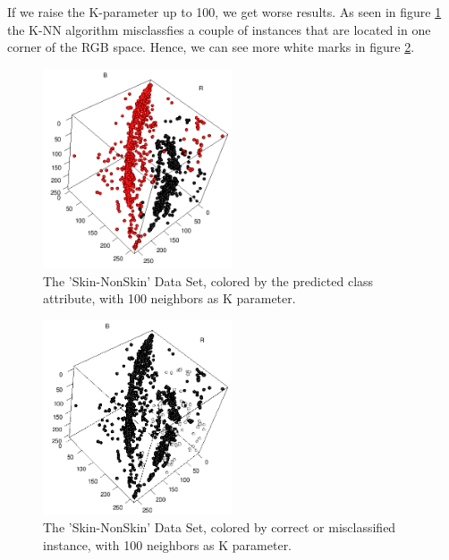 \documentclass[paper=a4, fontsize=11pt]{scrartcl} %
\numberwithin{equation}{section} %
\numberwithin{figure}{section} %
\numberwithin{table}{section} %
\begin{document}
If we raise the K-parameter up to 100, we get worse results. As seen in figure \ref{fig:skin:predicted:k100} the K-NN algorithm misclassfies a couple of instances that are located in one corner of the RGB space. Hence, we can see more white marks in figure \ref{fig:skin:correct:k100}.

\begin{figure}[0.5\textwidth]
    \begin{center}
\includegraphics[width=0.5\textwidth]{Skin_predicted_k100}
    \end{center}
\caption['Skin-NonSkin' prediction with k=100]{The 'Skin-NonSkin' Data Set, colored by the predicted class attribute, with 100 neighbors as K parameter.}
\label{fig:skin:predicted:k100}
\end{figure}


\begin{figure}[0.5\textwidth]
    \begin{center}
\includegraphics[width=0.5\textwidth]{Skin_correct_k100}
    \end{center}
\caption['Skin-NonSkin' correctness with k=100]{The 'Skin-NonSkin' Data Set, colored by correct or misclassified instance, with 100 neighbors as K parameter.}
\label{fig:skin:correct:k100}
\end{figure}
\end{document}
